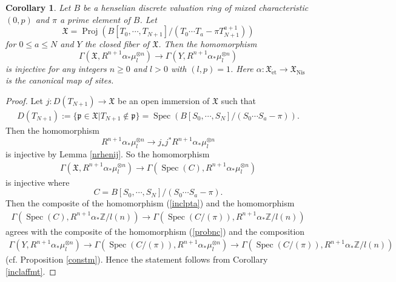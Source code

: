 \documentclass{article}
\newtheorem{cor}[thm]{\indent \sc Corollary}
\newcommand{\spec}{\operatorname{Spec}}
\newcommand{\et}{\mathrm{\acute{e}t}}
\newcommand{\Nis}{\mathrm{Nis}}
\begin{document}
%
\begin{cor}\upshape\label{injproEx}
Let $B$ be a henselian discrete valuation ring of mixed characteristic $(0, p)$
and $\pi$ a prime element of $B$. Let
%
\begin{equation*}
\mathfrak{X}
=
\operatorname{Proj}\left(
B[T_{0}, \cdots, T_{N+1}]/
(T_{0}\cdots
T_{a}-\pi T_{N+1}^{a+1}
)
\right)
\end{equation*}
%
for $0\leq a\leq N$ and
$Y$ the closed fiber of $\mathfrak{X}$. 
Then the homomorphism
%
\begin{equation}\label{probnc}
\Gamma\left(
\mathfrak{X},
R^{n+1}\alpha_{*}\mu_{l}^{\otimes n}
\right)
\to
\Gamma\left(
Y,
R^{n+1}\alpha_{*}\mu_{l}^{\otimes n}
\right)
\end{equation}
%
is injective for any integers $n\geq 0$ and $l>0$ with
$(l, p)=1$. Here 
$\alpha: \mathfrak{X}_{\et}\to \mathfrak{X}_{\Nis}$
is the canonical map of sites.
\end{cor}
%

%
\begin{proof}\upshape
Let 
%
\begin{math}
j: D(T_{N+1})\to  
\mathfrak{X}
\end{math}
%
be an open immersion of $\mathfrak{X}$ such that
%
\begin{align*}
D(T_{N+1})
:=
\{
\mathfrak{p}\in \mathfrak{X}|
T_{N+1}\notin\mathfrak{p}
\}
=\spec(
B[S_{0}, \cdots, S_{N}]/
(S_{0}\cdots S_{a}-\pi)
).
\end{align*}
%
Then the homomorphism
%
\begin{equation*}
R^{n+1}\alpha_{*}\mu_{l}^{\otimes n}
\to 
j_{*}j^{*}R^{n+1}\alpha_{*}\mu_{l}^{\otimes n}
\end{equation*}
%
is injective by Lemma \ref{nrhenij}. So the homomorphism
%
\begin{align}\label{inclpta}
\Gamma\left(
\mathfrak{X},
R^{n+1}\alpha_{*}\mu_{l}^{\otimes n}
\right)
\to
\Gamma\left(
\spec(C),
R^{n+1}\alpha_{*}\mu_{l}^{\otimes n}
\right)
\end{align}
%
is injective where
%
\begin{equation*}
C=
B[S_{0}, \cdots, S_{N}]/
(S_{0}\cdots S_{a}-\pi).    
\end{equation*}
% 
Then the composite of the homomorphism (\ref{inclpta}) and the homomorphism
%
\begin{align*}
\Gamma\left(
\spec(C),
R^{n+1}\alpha_{*}\mathbb{Z}/l(n)
\right)
\to
\Gamma\left(
\spec(C/(\pi)),
R^{n+1}\alpha_{*}\mathbb{Z}/l(n)
\right)
\end{align*}
%
agrees with the composite of the homomorphism (\ref{probnc}) and
the composition
%
\footnotesize
\begin{align*}
\Gamma\left(
Y, 
R^{n+1}\alpha_{*}
\mu_{l}^{\otimes n}
\right) 
\to
\Gamma\left(
\spec(C/(\pi)),
R^{n+1}\alpha_{*}
\mu_{l}^{\otimes n}
\right)
\to
\Gamma\left(
\spec(C/(\pi)),
R^{n+1}\alpha_{*}
\mathbb{Z}/l(n)
\right)
\end{align*}
\normalsize
%
(cf. Proposition \ref{constm}).
Hence the statement follows from Corollary \ref{inclaffmt}.
\end{proof}
%
\end{document}
